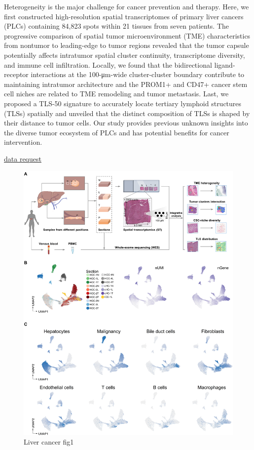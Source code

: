 \documentclass[
]{book}
\begin{document}
Heterogeneity is the major challenge for cancer prevention and therapy. Here, we first constructed high-resolution spatial transcriptomes of primary liver cancers (PLCs) containing 84,823 spots within 21 tissues from seven patients. The progressive comparison of spatial tumor microenvironment (TME) characteristics from nontumor to leading-edge to tumor regions revealed that the tumor capsule potentially affects intratumor spatial cluster continuity, transcriptome diversity, and immune cell infiltration. Locally, we found that the bidirectional ligand-receptor interactions at the 100-μm-wide cluster-cluster boundary contribute to maintaining intratumor architecture and the PROM1+ and CD47+ cancer stem cell niches are related to TME remodeling and tumor metastasis. Last, we proposed a TLS-50 signature to accurately locate tertiary lymphoid structures (TLSs) spatially and unveiled that the distinct composition of TLSs is shaped by their distance to tumor cells. Our study provides previous unknown insights into the diverse tumor ecosystem of PLCs and has potential benefits for cancer intervention.\citep{wu2021comprehensive}

\href{https://ngdc.cncb.ac.cn/gsa-human/browse/HRA000437}{data request}

\begin{figure}
\centering
\includegraphics{./figs/spatialDatasets/sciadv.abg3750-f1.jpg}
\caption{Liver cancer fig1}
\end{figure}
\end{document}
